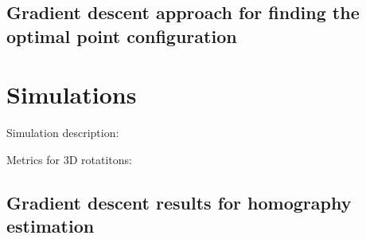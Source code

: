 \documentclass[letterpaper, 10 pt, conference]{ieeeconf}  %
\begin{document}







\subsection{Gradient descent approach for finding the optimal point configuration}



\section{Simulations}
\label{Sims}

Simulation description:


Metrics for 3D rotatitons:\cite{Huynh2009}


\subsection{Gradient descent results for homography estimation}
\end{document}
